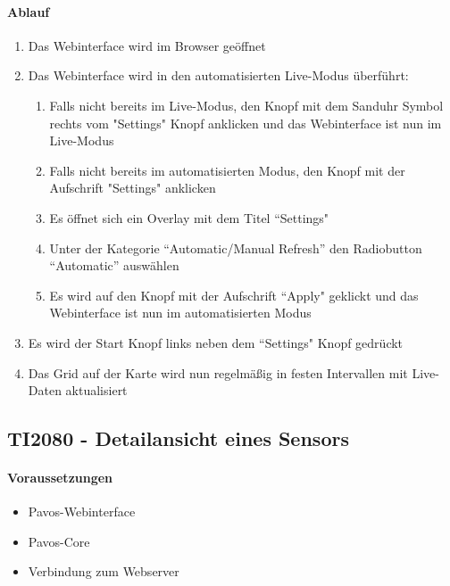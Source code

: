 \paragraph{Ablauf}
\begin{enumerate}
\item Das Webinterface wird im Browser geöffnet
\item Das Webinterface wird in den automatisierten Live-Modus überführt:
\begin{enumerate}
\item Falls nicht bereits im Live-Modus, den Knopf mit dem Sanduhr Symbol rechts vom "Settings" Knopf anklicken und das Webinterface ist nun im Live-Modus
\item Falls nicht bereits im automatisierten Modus, den Knopf mit der Aufschrift "Settings" anklicken
\item Es öffnet sich ein Overlay mit dem Titel ``Settings"
\item Unter der Kategorie ``Automatic/Manual Refresh'' den Radiobutton ``Automatic'' auswählen
\item Es wird auf den Knopf mit der Aufschrift ``Apply" geklickt und das Webinterface ist nun im automatisierten Modus
\end{enumerate}
\item Es wird der Start Knopf links neben dem ``Settings" Knopf gedrückt
\item Das Grid auf der Karte wird nun regelmäßig in festen Intervallen mit Live-Daten aktualisiert
\end{enumerate}
\szenarioGood

\subsection{TI2080 - Detailansicht eines Sensors}
\paragraph{Voraussetzungen}
\begin{itemize}
\item Pavos-Webinterface
\item Pavos-Core
\item Verbindung zum Webserver
\end{itemize}
